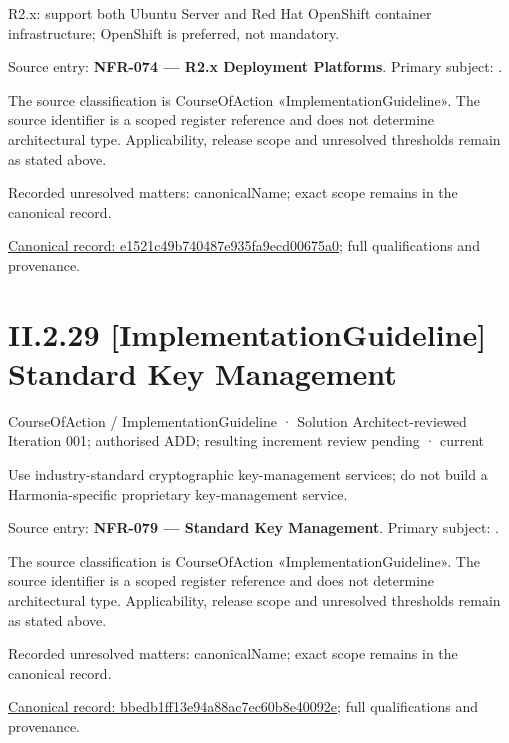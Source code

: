 R2.x: support both Ubuntu Server and Red Hat OpenShift container infrastructure; OpenShift is preferred, not mandatory.



Source entry: \textbf{NFR-074 — R2.x Deployment Platforms}. Primary subject: \texttt{}.



The source classification is CourseOfAction «ImplementationGuideline». The source identifier is a scoped register reference and does not determine architectural type. Applicability, release scope and unresolved thresholds remain as stated above.


{\small Recorded unresolved matters: canonicalName; exact scope remains in the canonical record.}\par
{\footnotesize \href{../../../../continuum/strategy/course-of-action/implementation-guideline/e1521c49b740487e935fa9ecd00675a0.md}{Canonical record: e1521c49b740487e935fa9ecd00675a0}; full qualifications and provenance.}\par
\section*{II.2.29 [ImplementationGuideline] Standard Key Management}
\label{navigation:II.2.29}

\label{element:bbedb1ff13e94a88ac7ec60b8e40092e}
{\small CourseOfAction / ImplementationGuideline · Solution Architect-reviewed Iteration 001; authorised ADD; resulting increment review pending · current}\par

Use industry-standard cryptographic key-management services; do not build a Harmonia-specific proprietary key-management service.



Source entry: \textbf{NFR-079 — Standard Key Management}. Primary subject: \texttt{}.



The source classification is CourseOfAction «ImplementationGuideline». The source identifier is a scoped register reference and does not determine architectural type. Applicability, release scope and unresolved thresholds remain as stated above.


{\small Recorded unresolved matters: canonicalName; exact scope remains in the canonical record.}\par
{\footnotesize \href{../../../../continuum/strategy/course-of-action/implementation-guideline/bbedb1ff13e94a88ac7ec60b8e40092e.md}{Canonical record: bbedb1ff13e94a88ac7ec60b8e40092e}; full qualifications and provenance.}\par
